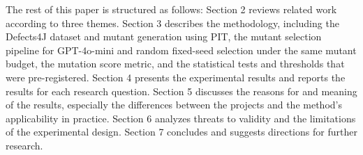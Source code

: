 The rest of this paper is structured as follows: Section 2 reviews related work according to three themes. Section 3 describes the methodology, including the Defects4J dataset and mutant generation using PIT, the mutant selection pipeline for GPT-4o-mini and random fixed-seed selection under the same mutant budget, the mutation score metric, and the statistical tests and thresholds that were pre-registered. Section 4 presents the experimental results and reports the results for each research question. Section 5 discusses the reasons for and meaning of the results, especially the differences between the projects and the method's applicability in practice. Section 6 analyzes threats to validity and the limitations of the experimental design. Section 7 concludes and suggests directions for further research.

